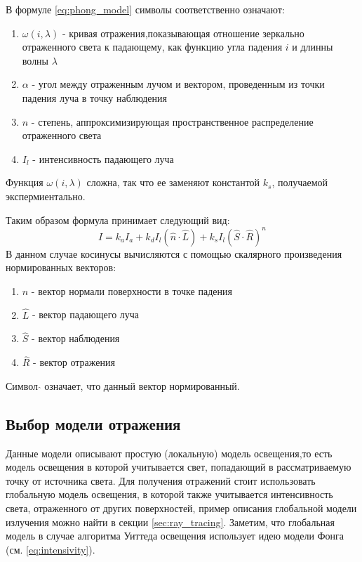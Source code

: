 \documentclass[a4paper,14pt, unknownkeysallowed]{extreport}
\begin{document}
В формуле \ref{eq:phong_model} символы соответственно означают:
\begin{enumerate} 
	\item $\omega(i,\lambda)$ - кривая отражения,показывающая отношение зеркально отраженного света к падающему, как функцию угла падения $i$ и длинны волны $\lambda$
	\item $\alpha$ - угол между отраженным лучом и вектором, проведенным из точки падения луча в точку наблюдения 
	\item $n$ - степень, аппроксимизирующая пространственное распределение отраженного света
	\item $I_l$ - интенсивность падающего луча
\end{enumerate}
Функция $\omega(i,\lambda)$ сложна, так что ее заменяют константой $k_s$, получаемой экспермиентально.


Таким образом формула принимает следующий вид:
\begin{equation} 
	I = k_aI_a + k_dI_{l}(\hat{n} \cdot \hat{L}) + k_s  I_{l}(\hat{S} \cdot \hat{R})^n
\end{equation}
В данном случае косинусы вычисляются с помощью скалярного произведения нормированных векторов:
\begin{enumerate}
	\item $\hat{n}$ - вектор нормали поверхности в точке падения
	\item $\hat{L}$ - вектор падающего луча
	\item $\hat{S}$ - вектор наблюдения
	\item $\hat{R}$ - вектор отражения
\end{enumerate}
Символ $\hat{}$ означает, что данный вектор нормированный.\cite{}




\subsection{Выбор модели отражения}
Данные модели описывают простую (локальную) модель освещения,то есть модель освещения в которой учитывается свет, попадающий в рассматриваемую точку от источника света.
Для получения отражений стоит использовать глобальную модель освещения, в которой также учитывается интенсивность света, отраженного от других поверхностей, пример описания глобальной модели излучения можно найти в секции \ref{sec:ray_tracing}.
Заметим, что глобальная модель в случае алгоритма Уиттеда освещения использует идею модели Фонга (см. \ref{eq:intensivity}).
\end{document}
